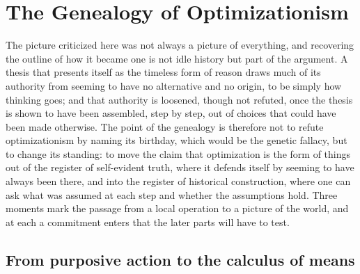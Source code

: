\section{The Genealogy of Optimizationism}
\label{p25:sec:genealogy}

\noindent
The picture criticized here was not always a picture of everything, and recovering the outline of how it became one is not idle history but part of the argument. A thesis that presents itself as the timeless form of reason draws much of its authority from seeming to have no alternative and no origin, to be simply how thinking goes; and that authority is loosened, though not refuted, once the thesis is shown to have been assembled, step by step, out of choices that could have been made otherwise. The point of the genealogy is therefore not to refute optimizationism by naming its birthday, which would be the genetic fallacy, but to change its standing: to move the claim that optimization is the form of things out of the register of self-evident truth, where it defends itself by seeming to have always been there, and into the register of historical construction, where one can ask what was assumed at each step and whether the assumptions hold. Three moments mark the passage from a local operation to a picture of the world, and at each a commitment enters that the later parts will have to test.

\subsection*{From purposive action to the calculus of means}

